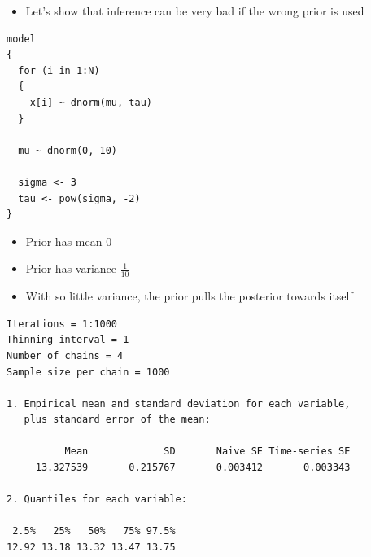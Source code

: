 \documentclass{beamer}
\begin{document}
\begin{frame}[fragile]
  \begin{itemize}
    \item{Let's show that inference can be very bad if the wrong prior is used}
  \end{itemize}
\end{frame}

\begin{frame}[fragile]
  \begin{verbatim}
model
{
  for (i in 1:N)
  {
    x[i] ~ dnorm(mu, tau)
  }
  
  mu ~ dnorm(0, 10)
  
  sigma <- 3
  tau <- pow(sigma, -2)
}
  \end{verbatim}
\end{frame}

\begin{frame}[fragile]
  \begin{itemize}
    \item{Prior has mean $0$}
    \item{Prior has variance $\frac{1}{10}$}
    \item{With so little variance, the prior pulls the posterior towards itself}
  \end{itemize}
\end{frame}

\begin{frame}[fragile]
  \begin{verbatim}
Iterations = 1:1000
Thinning interval = 1 
Number of chains = 4 
Sample size per chain = 1000 

1. Empirical mean and standard deviation for each variable,
   plus standard error of the mean:

          Mean             SD       Naive SE Time-series SE 
     13.327539       0.215767       0.003412       0.003343 

2. Quantiles for each variable:

 2.5%   25%   50%   75% 97.5% 
12.92 13.18 13.32 13.47 13.75 
  \end{verbatim}
\end{frame}
\end{document}
